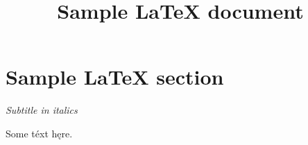 \documentclass[12pt]{article}
\title{Sample LaTeX document}
\begin{document}
\section*{Sample \LaTeX{} section}
\vspace{-1em}

\textit{Subtitle in italics}

Some téxt hęre.
\end{document}
